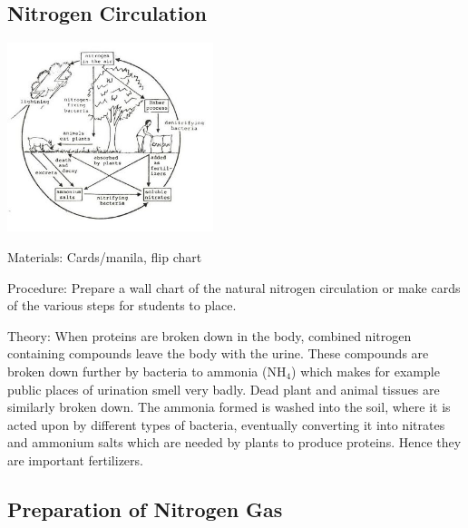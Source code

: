 \begin{multicols}{2}
\subsection{Nitrogen Circulation}

\begin{center}
\includegraphics[width=0.45\textwidth]{./img/source/nitrogen-cycle.jpg}
\end{center}

\begin{description*}
\item[Materials:]{Cards/manila, flip chart}
\item[Procedure:]{Prepare a wall chart of the natural nitrogen
circulation or make cards of the various steps for students to place. }
\item[Theory:]{When proteins are broken down in
the body, combined nitrogen containing
compounds leave the body with the urine. These
compounds are broken down further by bacteria
to ammonia (NH$_4$) which makes for example
public places of urination smell very badly.
Dead plant and animal tissues are similarly
broken down. The ammonia formed is washed
into the soil, where it is acted upon by different
types of bacteria, eventually converting it into
nitrates and ammonium salts which are needed
by plants to produce proteins. Hence they are
important fertilizers.}
\end{description*}

\subsection{Preparation of Nitrogen Gas} %


\end{multicols}
